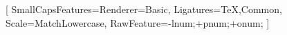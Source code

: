 \setmainfont{EB Garamond}
		[
			SmallCapsFeatures={Renderer=Basic},
			Ligatures={TeX,Common},
			Scale=MatchLowercase,
			RawFeature=-lnum;+pnum;+onum;
		]
